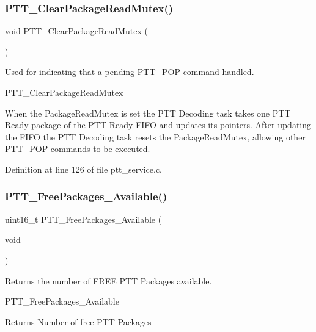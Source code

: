\subsubsection{\texorpdfstring{P\+T\+T\+\_\+\+Clear\+Package\+Read\+Mutex()}{PTT\_ClearPackageReadMutex()}}
{\footnotesize\ttfamily void P\+T\+T\+\_\+\+Clear\+Package\+Read\+Mutex (\begin{DoxyParamCaption}{ }\end{DoxyParamCaption})}



Used for indicating that a pending P\+T\+T\+\_\+\+P\+OP command handled. 

P\+T\+T\+\_\+\+Clear\+Package\+Read\+Mutex

When the Package\+Read\+Mutex is set the P\+TT Decoding task takes one P\+TT Ready package of the P\+TT Ready F\+I\+FO and updates its pointers. After updating the F\+I\+FO the P\+TT Decoding task resets the Package\+Read\+Mutex, allowing other P\+T\+T\+\_\+\+P\+OP commands to be executed. 

Definition at line 126 of file ptt\+\_\+service.\+c.

\mbox{\label{group___p_t_t___service_gac724bfd5cc2a6ee83d69e55ada24d523}} 
\subsubsection{\texorpdfstring{P\+T\+T\+\_\+\+Free\+Packages\+\_\+\+Available()}{PTT\_FreePackages\_Available()}}
{\footnotesize\ttfamily uint16\+\_\+t P\+T\+T\+\_\+\+Free\+Packages\+\_\+\+Available (\begin{DoxyParamCaption}\item[{void}]{ }\end{DoxyParamCaption})}



Returns the number of F\+R\+EE P\+TT Packages available. 

P\+T\+T\+\_\+\+Free\+Packages\+\_\+\+Available \begin{DoxyReturn}{Returns}
Number of free P\+TT Packages 
\end{DoxyReturn}


